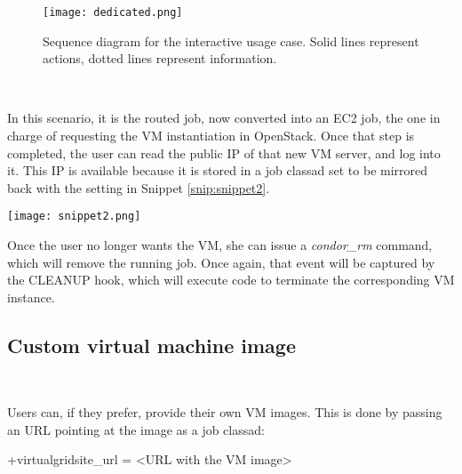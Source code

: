 \documentclass[a4paper]{jpconf}
\begin{document}
\begin{figure}[h]
    \centering
    \texttt{[image: dedicated.png]}
    \caption{Sequence diagram for the interactive usage case. Solid lines represent actions, dotted lines represent information.}
    \label{fig:interactive}
\end{figure}

~

In this scenario, it is the routed job, now converted into an EC2 job, 
the one in charge of requesting the VM instantiation in OpenStack.
Once that step is completed, the user can read the public IP of that new VM server, and log into it. 
This IP is available because it is stored in a job classad set to be mirrored back with the setting in Snippet \ref{snip:snippet2}.

\begin{snippet}[h]
    \centering
    \renewcommand\figurename{Snippet}
    \texttt{[image: snippet2.png]}
    \caption{Setup for a classad to be mirrored from the routed job to the source job.}
    \label{snip:snippet2}
\end{snippet}


Once the user no longer wants the VM, she can issue a \textit{condor\_rm}
command, which will remove the running job. 
Once again, that event will be captured by the CLEANUP hook, which will execute
code to terminate the corresponding VM instance.


\subsection{Custom virtual machine image}

~

Users can, if they prefer, provide their own VM images. 
This is done by passing an URL pointing at the image as a job classad:
\begin{center}
    +virtualgridsite\_url = \textless URL with the VM image\textgreater
\end{center}
\end{document}
